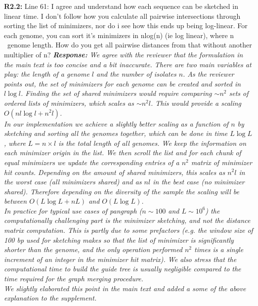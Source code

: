 \documentclass[aps,rmp,onecolumn]{revtex4-1}
\newcommand{\Marco}[1]{{\color{gray}Marco: #1}}
\newcommand{\Liam}[1]{{\color{teal}Liam: #1}}
\newcommand{\reviewer}[2]{\textbf{#1:} #2\vskip 5mm}
\newcommand{\response}[1]{{\it {\color{response}\textbf{Response:} #1}}\vskip 5mm}
\begin{document}
\reviewer{R2.2}{Line 61: I agree and understand how each sequence can be sketched in linear time. I don't follow how you calculate all pairwise intersections through sorting the list of minimizers, nor do i see how this ends up being log-linear. For each genome, you can sort it's minimizers in nlog(n) (ie log linear), where n ~genome length. How do you get all pairwise distances from that without another multiplier of n?}
\response{We agree with the reviewer that the formulation in the main text is too concise and a bit inaccurate.
      There are two main variables at play: the length of a genome $l$ and the number of isolates $n$. As the reviewer points out, the set of minimizers for each genome can be created and sorted in $l \log l$. Finding the set of shared minimizers would require comparing $\sim n^2$ sets of ordered lists of minimizers, which scales as $\sim n^2 l$. This would provide a scaling $O(n l \log l + n^2 l)$.\\
      In our implementation we achieve a slightly better scaling as a function of $n$ by sketching and sorting all the genomes together, which can be done in time $L \log L$, where $L= n \times l$ is the total length of all genomes. We keep the information on each minimizer origin in the list. We then scroll the list and for each chunk of equal minimizers we update the corresponding entries of a $n^2$ matrix of minimizer hit counts. Depending on the amount of shared minimizers, this scales as $n^2 l$ in the worst case (all minimizers shared) and as $n l$ in the best case (no minimizer shared). Therefore depending on the diversity of the sample the scaling will be between $O(L \log L + n L)$ and $O(L \log L)$.\\
      In practice for typical use cases of pangraph ($n \sim 100$ and $L \sim 10^6$) the computationally challenging part is the minimizer sketching, and not the distance matrix computation. This is partly due to some prefactors (e.g. the window size of 100 bp used for sketching makes so that the list of minimizer is significantly shorter than the genome, and the only operation performed $n^2$ times is a single increment of an integer in the minimizer hit matrix). We also stress that the computational time to build the guide tree is usually negligible compared to the time required for the graph merging procedure.\\
      We slightly elaborated this point in the main text and added a some of the above explanation to the supplement.
}
\end{document}
